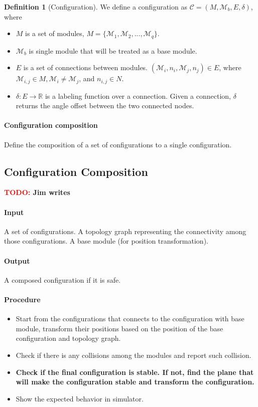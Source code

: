 \documentclass[conference]{IEEEtran}
\theoremstyle{definition}
\newtheorem{definition}{Definition}[section]
\newcommand{\TODO}[1]{ {\bf \textcolor{red}{TODO:} #1 }}
\begin{document}
\begin{definition}[Configuration] 
We define a configuration as $\mathcal{C}=(M, \mathcal{M}_b, E, \delta)$, where
\begin{itemize}
\item $M$ is a set of modules, $M=\{\mathcal{M}_1, \mathcal{M}_2, ..., \mathcal{M}_q\}$.
\item $\mathcal{M}_b$ is single module that will be treated as a base module.
\item $E$ is a set of connections between modules. $(\mathcal{M}_i, n_i, \mathcal{M}_j, n_j)\in E$, where $\mathcal{M}_{i,j} \in M, \mathcal{M}_i \neq \mathcal{M}_j$, and $n_{i,j}\in N$.
\item $\delta: E \rightarrow \mathbb{R}$ is a labeling function over a connection. Given a connection, $\delta$ returns the angle offset between the two connected nodes.
\end{itemize}
\end{definition}

\paragraph{Configuration composition}
Define the composition of a set of configurations to a single configuration.

\subsection{Configuration Composition}
\TODO{Jim writes}
\paragraph{Input}
A set of configurations. A topology graph representing the connectivity among those configurations. A base module (for position transformation).
\paragraph{Output}
A composed configuration if it is safe.
\paragraph{Procedure}
\begin{itemize}
\item Start from the configurations that connects to the configuration with base module, transform their positions based on the position of the base configuration and topology graph.
\item Check if there is any collisions among the modules and report such collision.
\item \textbf{Check if the final configuration is stable. If not, find the plane that will make the configuration stable and transform the configuration.}
\item Show the expected behavior in simulator.
\end{itemize}
\end{document}
